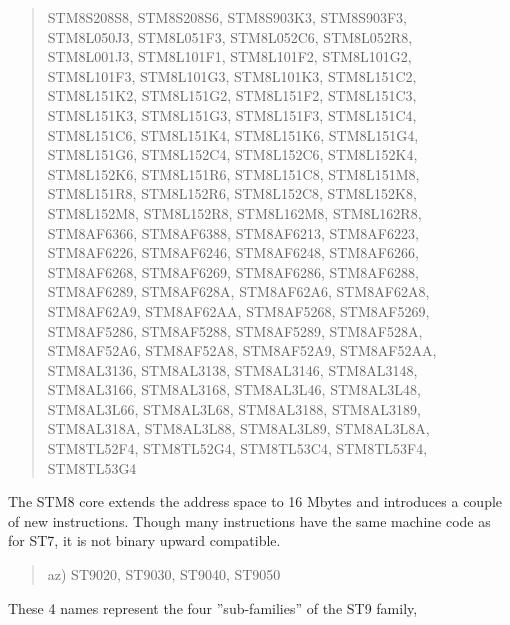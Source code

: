 \documentclass[12pt,twoside]{report}
\begin{document}
\begin{quote}
    STM8S208S8, STM8S208S6, STM8S903K3, STM8S903F3,\\
    STM8L050J3, STM8L051F3, STM8L052C6, STM8L052R8,\\
    STM8L001J3, STM8L101F1, STM8L101F2, STM8L101G2,\\
    STM8L101F3, STM8L101G3, STM8L101K3, STM8L151C2,\\
    STM8L151K2, STM8L151G2, STM8L151F2, STM8L151C3,\\
    STM8L151K3, STM8L151G3, STM8L151F3, STM8L151C4,\\
    STM8L151C6, STM8L151K4, STM8L151K6, STM8L151G4,\\
    STM8L151G6, STM8L152C4, STM8L152C6, STM8L152K4,\\
    STM8L152K6, STM8L151R6, STM8L151C8, STM8L151M8,\\
    STM8L151R8, STM8L152R6, STM8L152C8, STM8L152K8,\\
    STM8L152M8, STM8L152R8, STM8L162M8, STM8L162R8,\\
    STM8AF6366, STM8AF6388, STM8AF6213, STM8AF6223,\\
    STM8AF6226, STM8AF6246, STM8AF6248, STM8AF6266,\\
    STM8AF6268, STM8AF6269, STM8AF6286, STM8AF6288,\\
    STM8AF6289, STM8AF628A, STM8AF62A6, STM8AF62A8,\\
    STM8AF62A9, STM8AF62AA, STM8AF5268, STM8AF5269,\\
    STM8AF5286, STM8AF5288, STM8AF5289, STM8AF528A,\\
    STM8AF52A6, STM8AF52A8, STM8AF52A9, STM8AF52AA,\\
    STM8AL3136, STM8AL3138, STM8AL3146, STM8AL3148,\\
    STM8AL3166, STM8AL3168, STM8AL3L46, STM8AL3L48,\\
    STM8AL3L66, STM8AL3L68, STM8AL3188, STM8AL3189,\\
    STM8AL318A, STM8AL3L88, STM8AL3L89, STM8AL3L8A,\\
    STM8TL52F4, STM8TL52G4, STM8TL53C4, STM8TL53F4,\\
    STM8TL53G4
\end{quote}
The STM8 core extends the address space to 16 Mbytes and introduces
a couple of new instructions.  Though many instructions have the same
machine code as for ST7, it is not binary upward compatible.
\begin{quote}
az) ST9020, ST9030, ST9040, ST9050
\end{quote}
These 4 names represent the four ''sub-families'' of the ST9 family,
\end{document}

